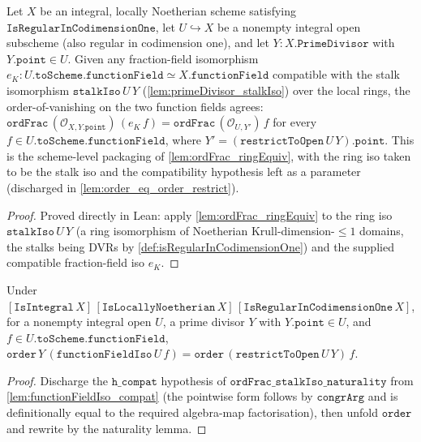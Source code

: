 \begin{lemma}

  \label{lem:ordFrac_stalkIso_naturality}
  Let \(X\) be an integral, locally Noetherian scheme satisfying
  \(\texttt{IsRegularInCodimensionOne}\), let \(U \hookrightarrow X\) be a
  nonempty integral open subscheme (also regular in codimension one), and let
  \(Y : X.\texttt{PrimeDivisor}\) with \(Y.\texttt{point} \in U\). Given any
  fraction-field isomorphism
  \(e_K \colon U.\texttt{toScheme}.\texttt{functionField} \simeq
   X.\texttt{functionField}\) compatible with the stalk isomorphism
  \(\texttt{stalkIso}\,U\,Y\) (\ref{lem:primeDivisor_stalkIso}) over the local
  rings, the order-of-vanishing on the two function fields agrees:
  \(\texttt{ordFrac}\,(\mathcal O_{X, Y.\texttt{point}})\,(e_K\,f)
   = \texttt{ordFrac}\,(\mathcal O_{U, Y'})\,f\)
  for every \(f \in U.\texttt{toScheme}.\texttt{functionField}\), where
  \(Y' = (\texttt{restrictToOpen}\,U\,Y).\texttt{point}\). This is the
  scheme-level packaging of \ref{lem:ordFrac_ringEquiv}, with the ring iso
  taken to be the stalk iso and the compatibility hypothesis left as a
  parameter (discharged in \ref{lem:order_eq_order_restrict}).
\end{lemma}
\begin{proof}
  Proved directly in Lean: apply \ref{lem:ordFrac_ringEquiv} to the ring iso
  \(\texttt{stalkIso}\,U\,Y\) (a ring isomorphism of Noetherian
  Krull-dimension-\(\leq 1\) domains, the stalks being DVRs by
  \ref{def:isRegularInCodimensionOne}) and the supplied compatible
  fraction-field iso \(e_K\).
\end{proof}
\begin{lemma}
  \label{lem:order_eq_order_restrict}
  Under \([\texttt{IsIntegral}\,X]\,[\texttt{IsLocallyNoetherian}\,X]\,
  [\texttt{IsRegularInCodimensionOne}\,X]\), for a nonempty integral
  open \(U\), a prime divisor \(Y\) with \(Y.\texttt{point} \in U\),
  and \(f \in U.\texttt{toScheme}.\texttt{functionField}\),
  \(\texttt{order}\,Y\,(\texttt{functionFieldIso}\,U\,f)
   = \texttt{order}\,(\texttt{restrictToOpen}\,U\,Y)\,f\).
\end{lemma}
\begin{proof}
  Discharge the \(\texttt{h\_compat}\) hypothesis of
  \(\texttt{ordFrac\_stalkIso\_naturality}\) from
  \cref{lem:functionFieldIso_compat} (the pointwise form follows by
  \(\texttt{congrArg}\) and is definitionally equal to the required
  algebra-map factorisation), then unfold \(\texttt{order}\) and
  rewrite by the naturality lemma.
\end{proof}

